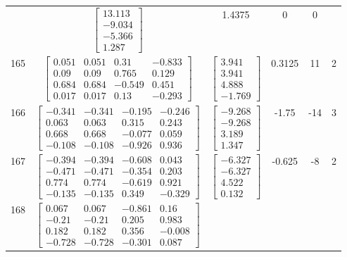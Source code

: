 \documentclass[a4paper,12pt]{article}
\begin{document}
\begin{tabular}{c c c c c c}
&
$\begin{bmatrix} 13.113 \\ -9.034 \\ -5.366 \\ 1.287 \end{bmatrix}$
&
1.4375
&
0
&
0
\\
165
&
$\begin{bmatrix} 0.051 & 0.051 & 0.31 & -0.833 \\ 0.09 & 0.09 & 0.765 & 0.129 \\ 0.684 & 0.684 & -0.549 & 0.451 \\ 0.017 & 0.017 & 0.13 & -0.293 \end{bmatrix}$
&
$\begin{bmatrix} 3.941 \\ 3.941 \\ 4.888 \\ -1.769 \end{bmatrix}$
&
0.3125
&
11
&
2
\\
166
&
$\begin{bmatrix} -0.341 & -0.341 & -0.195 & -0.246 \\ 0.063 & 0.063 & 0.315 & 0.243 \\ 0.668 & 0.668 & -0.077 & 0.059 \\ -0.108 & -0.108 & -0.926 & 0.936 \end{bmatrix}$
&
$\begin{bmatrix} -9.268 \\ -9.268 \\ 3.189 \\ 1.347 \end{bmatrix}$
&
-1.75
&
-14
&
3
\\
167
&
$\begin{bmatrix} -0.394 & -0.394 & -0.608 & 0.043 \\ -0.471 & -0.471 & -0.354 & 0.203 \\ 0.774 & 0.774 & -0.619 & 0.921 \\ -0.135 & -0.135 & 0.349 & -0.329 \end{bmatrix}$
&
$\begin{bmatrix} -6.327 \\ -6.327 \\ 4.522 \\ 0.132 \end{bmatrix}$
&
-0.625
&
-8
&
2
\\
168
&
$\begin{bmatrix} 0.067 & 0.067 & -0.861 & 0.16 \\ -0.21 & -0.21 & 0.205 & 0.983 \\ 0.182 & 0.182 & 0.356 & -0.008 \\ -0.728 & -0.728 & -0.301 & 0.087 \end{bmatrix}$

\end{tabular}
\end{document}
